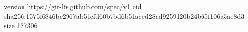 version https://git-lfs.github.com/spec/v1
oid sha256:1575f6846bc2967ab51cfd60b7bd6b51aced28ad9259120b24b65f106a5ae8d3
size 137306

